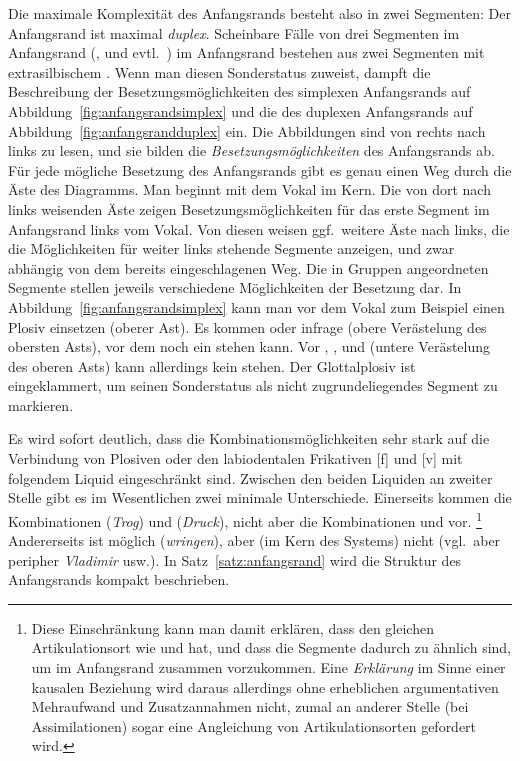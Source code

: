 Die maximale Komplexität des Anfangsrands besteht also in zwei Segmenten:
Der Anfangsrand ist maximal \textit{duplex}.
Scheinbare Fälle von drei Segmenten im Anfangsrand (\textipa{[SpK]}, \textipa{[StK]} und evtl.\ \textipa{[Spl]}) im Anfangsrand bestehen aus zwei Segmenten mit extrasilbischem \textipa{[S]}.
Wenn man \textipa{[S]} diesen Sonderstatus zuweist, dampft die Beschreibung der Besetzungsmöglichkeiten des simplexen Anfangsrands auf Abbildung~\ref{fig:anfangsrandsimplex} und die des duplexen Anfangsrands auf Abbildung~\ref{fig:anfangsrandduplex} ein.
Die Abbildungen sind von rechts nach links zu lesen, und sie bilden die \textit{Besetzungsmöglichkeiten} des Anfangsrands ab.
Für jede mögliche Besetzung des Anfangsrands gibt es genau einen Weg durch die Äste des Diagramms.
Man beginnt mit dem Vokal im Kern.
Die von dort nach links weisenden Äste zeigen Besetzungsmöglichkeiten für das erste Segment im Anfangsrand links vom Vokal.
Von diesen weisen ggf.\ weitere Äste nach links, die die Möglichkeiten für weiter links stehende Segmente anzeigen, und zwar abhängig von dem bereits eingeschlagenen Weg.
Die in Gruppen angeordneten Segmente stellen jeweils verschiedene Möglichkeiten der Besetzung dar.
In Abbildung~\ref{fig:anfangsrandsimplex} kann man vor dem Vokal zum Beispiel einen Plosiv einsetzen (oberer Ast).
Es kommen \textipa{[p]} oder \textipa{[t]} infrage (obere Verästelung des obersten Asts), vor dem noch ein \textipa{[S]} stehen kann.
Vor \textipa{[b]}, \textipa{[d]}, \textipa{[k]} und \textipa{[g]} (untere Verästelung des oberen Asts) kann allerdings kein \textipa{[S]} stehen.
Der Glottalplosiv \textipa{[P]} ist eingeklammert, um seinen Sonderstatus als nicht zugrundeliegendes Segment zu markieren.


Es wird sofort deutlich, dass die Kombinationsmöglichkeiten sehr stark auf die Verbindung von Plosiven oder den labiodentalen Frikativen [f] und [v] mit folgendem Liquid eingeschränkt sind.
Zwischen den beiden Liquiden an zweiter Stelle gibt es im Wesentlichen zwei minimale Unterschiede.
Einerseits kommen die Kombinationen \textipa{[tK]} (\textit{Trog}) und \textipa{[dK]} (\textit{Druck}), nicht aber die Kombinationen \textipa{[tl]} und \textipa{[dl]} vor.%
\footnote{Diese Einschränkung kann man damit erklären, dass \textipa{[l]} den gleichen Artikulationsort wie \textipa{[t]} und \textipa{[d]} hat, und dass die Segmente dadurch zu ähnlich sind, um im Anfangsrand zusammen vorzukommen.
Eine \textit{Erklärung} im Sinne einer kausalen Beziehung wird daraus allerdings ohne erheblichen argumentativen Mehraufwand und Zusatzannahmen nicht, zumal an anderer Stelle (bei Assimilationen) sogar eine Angleichung von Artikulationsorten gefordert wird.}
Andererseits ist \textipa{[vK]} möglich (\textit{wringen}), aber (im Kern des Systems) nicht \textipa{[vl]} (vgl.\ aber peripher \textit{Vladimir} usw.).
In Satz~\ref{satz:anfangsrand} wird die Struktur des Anfangsrands kompakt beschrieben.


